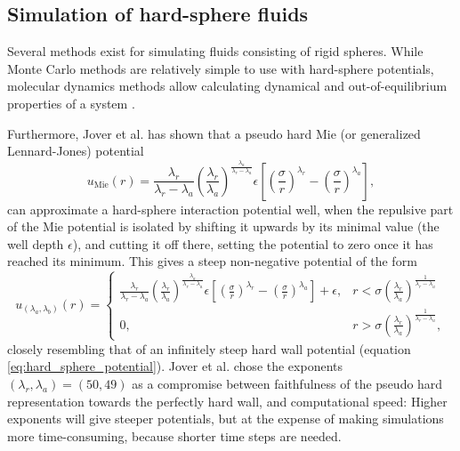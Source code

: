 
\subsection{Simulation of hard-sphere fluids}
Several methods exist for simulating fluids consisting of rigid spheres.
While Monte Carlo methods are relatively simple to use with hard-sphere potentials, 
molecular dynamics methods allow calculating dynamical and out-of-equilibrium properties of a system \cite{ref:allen:MD_sim}.

Furthermore, Jover et al. \cite{ref:jover:pseudo_hard} has shown that a pseudo hard Mie (or generalized Lennard-Jones) potential
\begin{equation}
    u_{\text{Mie}}(r) = 
        \frac{\lambda_r}{\lambda_r - \lambda_a}
        \left(\frac{\lambda_r}{\lambda_a}\right)
        ^{\frac{\lambda_a}{\lambda_r - \lambda_a}}
        \epsilon \left[
            \left(\frac{\sigma}{r}\right)^{\lambda_r} -
            \left(\frac{\sigma}{r}\right)^{\lambda_a}
        \right],
\end{equation}
can approximate a hard-sphere interaction potential well, when the repulsive part of the Mie potential 
is isolated by shifting it upwards by its minimal value (the well depth $\epsilon$), and cutting it off there, 
setting the potential to zero once it has reached its minimum.
This gives a steep non-negative potential of the form
\begin{equation}
    u_{(\lambda_a, \lambda_b)}(r) = 
    \begin{cases}
        \frac{\lambda_r}{\lambda_r - \lambda_a}
        \left(\frac{\lambda_r}{\lambda_a}\right)
        ^{\frac{\lambda_a}{\lambda_r - \lambda_a}}
        \epsilon \left[
            \left(\frac{\sigma}{r}\right)^{\lambda_r} -
            \left(\frac{\sigma}{r}\right)^{\lambda_a}
        \right]
        + \epsilon,
            & r < \sigma \left(
                \frac{\lambda_r}{\lambda_a}
            \right)^\frac{1}{\lambda_r - \lambda_a} \\
        0,  & r > \sigma \left(
                \frac{\lambda_r}{\lambda_a}
            \right)^\frac{1}{\lambda_r - \lambda_a},
    \end{cases}
\end{equation}
closely resembling that of an infinitely steep hard wall potential (equation \ref{eq:hard_sphere_potential}).
Jover et al. chose the exponents $(\lambda_r, \lambda_a) = (50, 49)$ as a compromise between 
faithfulness of the pseudo hard representation towards the perfectly hard wall, and computational speed:
Higher exponents will give steeper potentials, but at the expense of making simulations more time-consuming, 
because shorter time steps are needed.

